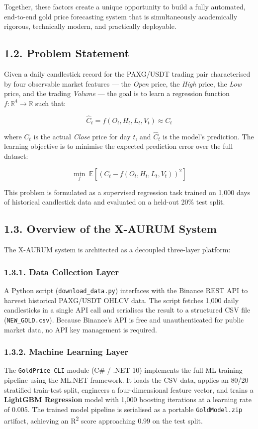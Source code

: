 Together, these factors create a unique opportunity to build a fully automated, end-to-end gold price forecasting system that is simultaneously academically rigorous, technically modern, and practically deployable.

\subsection{1.2. Problem Statement}

Given a daily candlestick record for the PAXG/USDT trading pair characterised by four observable market features --- the \textit{Open} price, the \textit{High} price, the \textit{Low} price, and the trading \textit{Volume} --- the goal is to learn a regression function $f: \mathbb{R}^4 \rightarrow \mathbb{R}$ such that:

\[
\hat{C}_t = f(O_t, H_t, L_t, V_t) \approx C_t
\]

where $C_t$ is the actual \textit{Close} price for day $t$, and $\hat{C}_t$ is the model's prediction. The learning objective is to minimise the expected prediction error over the full dataset:

\[
\min_f \; \mathbb{E}\left[(C_t - f(O_t, H_t, L_t, V_t))^2\right]
\]

This problem is formulated as a supervised regression task trained on 1,000 days of historical candlestick data and evaluated on a held-out 20\% test split.

\subsection{1.3. Overview of the X-AURUM System}

The X-AURUM system is architected as a decoupled three-layer platform:

\subsubsection{1.3.1. Data Collection Layer}
A Python script (\texttt{download\_data.py}) interfaces with the Binance REST API to harvest historical PAXG/USDT OHLCV data. The script fetches 1,000 daily candlesticks in a single API call and serialises the result to a structured CSV file (\texttt{NEW\_GOLD.csv}). Because Binance's API is free and unauthenticated for public market data, no API key management is required.

\subsubsection{1.3.2. Machine Learning Layer}
The \texttt{GoldPrice\_CLI} module (C\# / .NET 10) implements the full ML training pipeline using the ML.NET framework. It loads the CSV data, applies an 80/20 stratified train-test split, engineers a four-dimensional feature vector, and trains a \textbf{LightGBM Regression} model with 1,000 boosting iterations at a learning rate of 0.005. The trained model pipeline is serialised as a portable \texttt{GoldModel.zip} artifact, achieving an R\textsuperscript{2} score approaching 0.99 on the test split.

